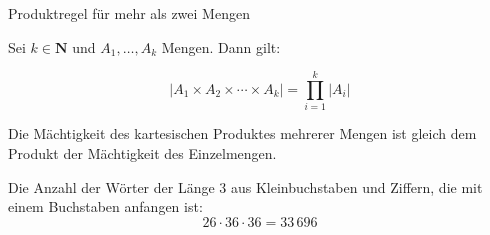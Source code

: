 \documentclass[12pt,ngerman,a4paper,ignorenonframetext,]{beamer}
\begin{document}
\begin{frame}{Produktregel für mehr als zwei Mengen}
\protect\hypertarget{produktregel-fur-mehr-als-zwei-mengen}{}


\begin{Satz}[Produktregel]

Sei \(k\in\mathbf{N}\) und \(A_1,\dots,A_k\) Mengen. Dann gilt:

\begin{equation*} 
    \left| A_1 \times A_2 \times \cdots \times A_k\right| = \prod_{i=1}^{k} \left| A_i \right| 
\end{equation*}

\end{Satz}


\begin{Bemerkung}[In Worten:]

Die Mächtigkeit des kartesischen Produktes mehrerer Mengen ist gleich
dem Produkt der Mächtigkeit des Einzelmengen.

\end{Bemerkung}


\begin{Beispiel}

Die Anzahl der Wörter der Länge 3 aus Kleinbuchstaben und Ziffern, die
mit einem Buchstaben anfangen ist: \begin{equation*}
    26 \cdot 36 \cdot 36 = 33\,696
\end{equation*}

\end{Beispiel}

\end{frame}
\end{document}

